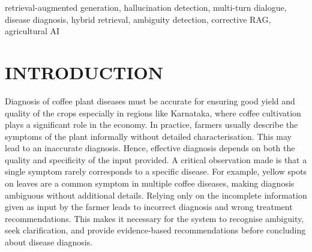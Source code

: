 \documentclass[conference]{IEEEtran}
\begin{document}
\begin{abstract}
Retrieval-Augmented Generation (RAG) is increasingly used in the agricultural field such as disease diagnosis, but it still faces some important issues. Even if they may not accurately fit the specified symptoms, some diseases show up more frequently in the retrieved results. Additionally, the system may produce inaccurate or results (hallucinations) if farmers supply inadequate or ambiguous data. In this work, a balanced hybrid RAG-based system is proposed for coffee disease diagnosis to address these challenges. The system combines information stored in JSON format with unstructured knowledge from agricultural PDF documents, ensuring better coverage and balance across the diseases. The system also includes multi-turn interaction, which enables the system to ask simple clarification questions to the user. In addition, multiple responses are generated and compared with each other to measure consistency using a hallucination checking module. 

The system was evaluated on a small labeled dataset and it achieved a Top-1 accuracy of 50\% in the single-turn setup and improved to 66.67\% when multi-turn interaction was used. The Top-3 accuracy was 83.33\% which was used as a proxy measure. The average consistency score was 88.89\% while the hallucination rate was 25\%. Keyword-based approach was used to measure Precision@5 which came to 48.19\% and the mean CRAG relevance score was 0.6588. Overall, the proposed approach improves the reliability of RAG-based diagnosis systems for real-world agricultural use.

\end{abstract}

\begin{IEEEkeywords}
retrieval-augmented generation, hallucination detection, multi-turn dialogue, disease diagnosis, hybrid retrieval, ambiguity detection, corrective RAG, agricultural AI
\end{IEEEkeywords}

\section{INTRODUCTION}

Diagnosis of coffee plant diseases must be accurate for ensuring good yield and quality of the crops especially in regions like Karnataka, where coffee cultivation plays a significant role in the economy. In practice, farmers usually describe the symptoms of the plant informally without detailed characterisation. This may lead to an inaccurate diagnosis. Hence, effective diagnosis depends on both the quality and specificity of the input provided. A critical observation made is that a single symptom rarely corresponds to a specific disease. For example, yellow spots on leaves are a common symptom in multiple coffee diseases, making diagnosis ambiguous without additional details. Relying only on the incomplete information given as input by the farmer leads to incorrect diagnosis and wrong treatment recommendations. This makes it necessary for the system to recognise ambiguity, seek clarification, and provide evidence-based recommendations before concluding about disease diagnosis.
\end{document}
